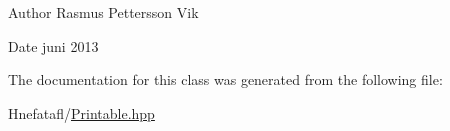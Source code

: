 \begin{DoxyAuthor}{Author}
Rasmus Pettersson Vik 
\end{DoxyAuthor}
\begin{DoxyDate}{Date}
juni 2013 
\end{DoxyDate}


The documentation for this class was generated from the following file\-:\begin{DoxyCompactItemize}
\item 
Hnefatafl/\hyperlink{_printable_8hpp}{Printable.\-hpp}\end{DoxyCompactItemize}
